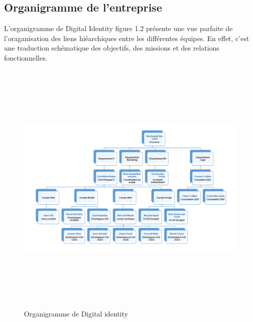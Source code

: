 

\newpage
\subsection{ Organigramme de l’entreprise }

L’organigramme de Digital Identity figure 1.2 présente une vue parfaite de l’oraganisation des
liens hiéarchiques entre les différentes équipes. En effet, c’est une traduction schématique des
objectifs, des missions et des relations fonctionnelles.

\begin{figure}[ht]
    \centering
    \includegraphics[width=1.1\textwidth,height=12.5cm]{chap1.images/org digid.png}
    \caption{Organigramme de Digital identity}
    \label{fig:orgcogecom}
\end{figure}


